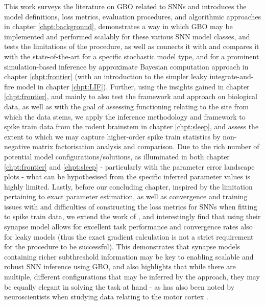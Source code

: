 \documentclass[mphil,deptreport,ianc]{infthesis} %
\begin{document}
This work surveys the literature on GBO related to SNNs and introduces the model definitions, loss metrics, evaluation procedures, and algorithmic approaches in chapter \ref{chpt:background}, demonstrates a way in which GBO may be implemented and performed scalably for these various SNN model classes, and tests the limitations of the procedure, as well as connects it with and compares it with the state-of-the-art for a specific stochastic model type, and for a prominent simulation-based inference by approximate Bayesian computation approach in chapter \ref{chpt:frontier} (with an introduction to the simpler leaky integrate-and-fire model in chapter \ref{chpt:LIF}).
Further, using the insights gained in chapter \ref{chpt:frontier}, and mainly to also test the framework and approach on biological data, as well as with the goal of assessing functioning relating to the site from which the data stems, we apply the inference methodology and framework to spike train data from the rodent brainstem in chapter \ref{chpt:sleep}, and assess the extent to which we may capture higher-order spike train statistics by non-negative matrix factorisation analysis and comparison. Due to the rich number of potential model configurations/solutions, as illuminated in both chapter \ref{chpt:frontier} and \ref{chpt:sleep} - particularly with the parameter error landscape plots - what can be hypothesised from the specific inferred parameter values is highly limited.
Lastly, before our concluding chapter, inspired by the limitation pertaining to exact parameter estimation, as well as convergence and training issues with and difficulties of constructing the loss metrics for SNNs when fitting to spike train data, we extend the work of \cite{Huh2018}, and interestingly find that using their synapse model allows for excellent task performance and convergence rates also for leaky models (thus the exact gradient calculation is not a strict requirement for the procedure to be successful). This demonstrates that synapse models containing richer subthreshold information may be key to enabling scalable and robust SNN inference using GBO, and also highlights that while there are multiple, different configurations that may be inferred by the approach, they may be equally elegant in solving the task at hand - as has also been noted by neuroscientists when studying data relating to the motor cortex \cite{Marblestone2016}.
\end{document}
